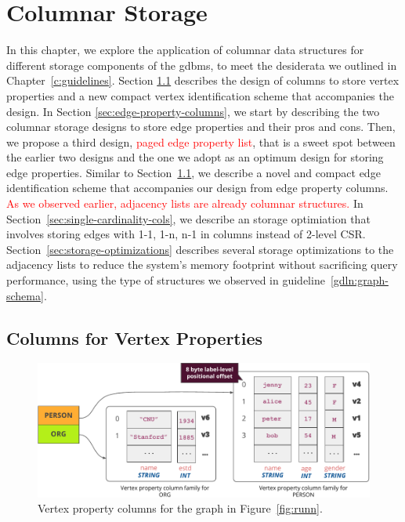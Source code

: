 \chapter{Columnar Storage}
\label{c:columnar-storage}

In this chapter, we explore the application of columnar data structures for different storage components of the \gls{gdbms}, to meet the desiderata we outlined in Chapter~\ref{c:guidelines}. Section \ref{sec:vertex-property-columns} describes the design of columns to store vertex properties and a new compact vertex identification scheme that accompanies the design. In Section \ref{sec:edge-property-columns}, we start by describing the two columnar storage designs to store edge properties and their pros and cons. Then, we propose a third design, \textcolor{red}{paged edge property list}, that is a sweet spot between the earlier two designs and the one we adopt as an optimum design for storing edge properties. Similar to Section~\ref{sec:vertex-property-columns}, we describe a novel and compact edge identification scheme that accompanies our design from edge property columns. \textcolor{red}{As we observed earlier, adjacency lists are already columnar structures.} In Section~\ref{sec:single-cardinality-cols}, we describe an storage optimiation that involves storing edges with 1-1, 1-n, n-1 in columns instead of 2-level CSR. Section~\ref{sec:storage-optimizations} describes several storage optimizations to the adjacency lists to reduce the system's memory footprint without sacrificing query performance, using the type of structures we observed in guideline~\ref{gdln:graph-schema}.

\section{Columns for Vertex Properties}
\label{sec:vertex-property-columns}

\begin{figure}
	\vspace{-25pt}
	\hfill\includegraphics[scale=0.85]{img/vpcols}\hspace*{\fill}
	\caption{Vertex property columns for the graph in Figure~\ref{fig:runn}.}
	\label{fig:vpcols}
	\vspace{-8pt}
\end{figure}

